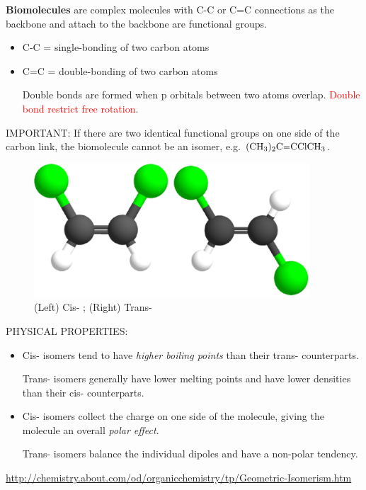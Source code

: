 \begin{mdframed}
{\bf Biomolecules} are complex molecules with C-C or C=C connections as the
backbone and attach to the backbone are functional groups.
\begin{itemize}
  \item C-C = single-bonding of two carbon atoms
  \item C=C = double-bonding of two carbon atoms
  
  Double bonds are formed when p orbitals between two atoms overlap.
  \textcolor{red}{Double bond restrict free rotation}.
\end{itemize}
IMPORTANT: If there are two identical functional groups on one side of the
carbon link, the biomolecule cannot be an isomer, e.g. $\ce{(CH3)2C=CClCH3}$.

\end{mdframed}



\begin{figure}[htb]
    \centerline{\includegraphics[height=5cm]{./images/Cis-Trans.eps}}
\caption{(Left) Cis- ; (Right) Trans-}\label{fig:Cis-Trans}
  \end{figure}

PHYSICAL PROPERTIES:
\begin{itemize}
  \item Cis- isomers tend to have {\it higher boiling points} than their trans-
  counterparts. 
  
  Trans- isomers generally have lower melting points and have lower
  densities than their cis- counterparts.
  
  \item Cis- isomers collect the charge on one side of the molecule, giving the
  molecule an overall {\it polar effect}. 
  
  Trans- isomers balance the individual dipoles and have a non-polar tendency.
\end{itemize}  
\url{http://chemistry.about.com/od/organicchemistry/tp/Geometric-Isomerism.htm}

